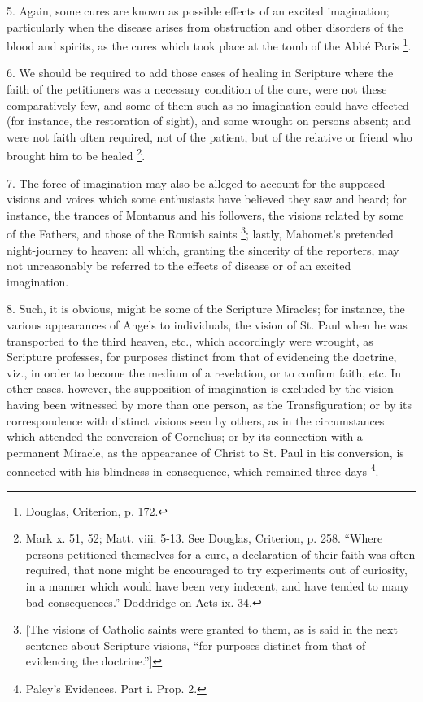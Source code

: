 5. Again, some cures are known as possible
effects of an excited imagination; particularly when the disease
arises from obstruction and other disorders of the blood and spirits,
as the cures which took place at the tomb of the Abbé Paris \footnote{Douglas, Criterion, p. 172.}.

6. We should be required to add those cases of
healing in Scripture where the faith of the petitioners was a
necessary condition of the cure, were not these comparatively few, and
some of them such as no imagination could have effected (for instance,
the restoration of sight), and some wrought on persons absent; and
were not faith often required, not of the patient, but of the relative
or friend who brought him to be healed \footnote{Mark x. 51, 52; Matt. viii. 5-13. See Douglas, Criterion, p. 258.
``Where persons petitioned themselves for a cure, a declaration of
their faith was often required, that none might be encouraged to try
experiments out of curiosity, in a manner which would have been very
indecent, and have tended to many bad consequences.'' Doddridge on Acts
ix. 34.}.

7. The force of imagination may also be alleged
to account for the supposed visions and voices which some enthusiasts
have believed they saw and heard; for instance, the trances of Montanus
and his followers, the visions related by some of the Fathers,
and those of the Romish saints \footnote{[The visions of Catholic saints were granted to them, as is said in
the next sentence about Scripture visions, ``for purposes distinct from
that of evidencing the doctrine.'']}; lastly, Mahomet's pretended night-journey to heaven: all
which, granting the sincerity of the reporters, may not unreasonably
be referred to the effects of disease or of an excited imagination.

8. Such, it is obvious, might be some of the
Scripture Miracles; for instance, the various appearances of Angels to
individuals, the vision of St. Paul when he was transported to the
third heaven, etc., which accordingly were wrought, as Scripture
professes, for purposes distinct from that of evidencing the doctrine,
viz., in order to become the medium of a revelation, or to confirm
faith, etc. In other cases, however, the supposition of imagination is
excluded by the vision having been witnessed by more than one person,
as the Transfiguration; or by its correspondence with distinct visions
seen by others, as in the circumstances which attended the conversion
of Cornelius; or by its connection with a permanent Miracle, as the
appearance of Christ to St. Paul in his conversion, is connected with
his blindness in consequence, which remained three days \footnote{Paley's Evidences, Part i. Prop. 2.}.

